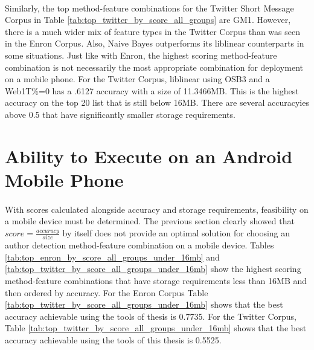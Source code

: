 \paragraph*{} Similarly, the top method-feature combinations for the Twitter Short Message Corpus in Table \ref{tab:top_twitter_by_score_all_groups} are GM1.  However, there is a much wider mix of feature types in the Twitter Corpus than was seen in the Enron Corpus.  Also, Naive Bayes outperforms its liblinear counterparts in some situations.  Just like with Enron, the highest scoring method-feature combination is not necessarily the most appropriate combination for deployment on a mobile phone.  For the Twitter Corpus, liblinear using OSB3 and a Web1T\%=0 has a .6127 accuracy with a size of 11.3466MB.  This is the highest accuracy on the top 20 list that is still below 16MB.  There are several accuracyies above 0.5 that have significantly smaller storage requirements.

\section{Ability to Execute on an Android Mobile Phone}
\paragraph*{} With scores calculated alongside accuracy and storage requirements, feasibility on a mobile device must be determined.  The previous section clearly showed that $score = \frac{accuracy}{size}$ by itself does not provide an optimal solution for choosing an author detection method-feature combination on a mobile device. Tables \ref{tab:top_enron_by_score_all_groups_under_16mb} and \ref{tab:top_twitter_by_score_all_groups_under_16mb} show the highest scoring method-feature combinations that have storage requirements less than 16MB and then ordered by accuracy.  For the Enron Corpus Table \ref{tab:top_twitter_by_score_all_groups_under_16mb} shows that the best accuracy achievable using the tools of thesis is 0.7735.  For the Twitter Corpus, Table \ref{tab:top_twitter_by_score_all_groups_under_16mb} shows that the best accuracy achievable using the tools of this thesis is 0.5525. 

